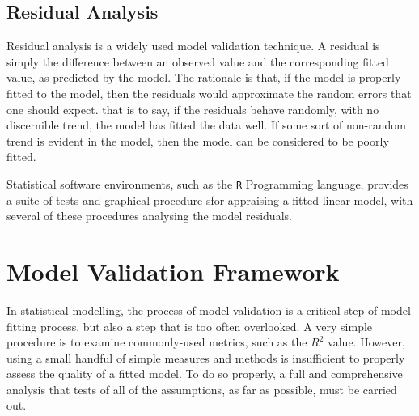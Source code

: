 \documentclass[12pt, a4paper]{article}
\begin{document}
\subsection{Residual Analysis}

Residual analysis is a widely used model validation technique. A residual is simply the difference between an observed value and the corresponding fitted value, as predicted by the model. The rationale is that, if the model is properly fitted to the model, then the residuals would approximate the random errors that one should expect.
that is to say, if the residuals behave randomly, with no discernible trend, the model has fitted the data well. If some sort of non-random trend is evident in the model, then the model can be considered to be poorly fitted.


Statistical software environments, such as the \texttt{R} Programming language, provides a suite of tests and graphical procedure sfor appraising a fitted linear model, with several 
of these procedures analysing the model residuals.



\newpage	%
\section{Model Validation Framework}
In statistical modelling, the process of model validation is a critical step of model fitting process, but also a step that is too often overlooked. A very simple procedure is to examine commonly-used
metrics, such as the $R^2$ value. However, using a small handful of simple measures and methods is insufficient to properly assess the quality of a fitted model. To do so properly, a full and comprehensive
analysis that tests of all of the assumptions, as far as possible, must be carried out.
\end{document}
